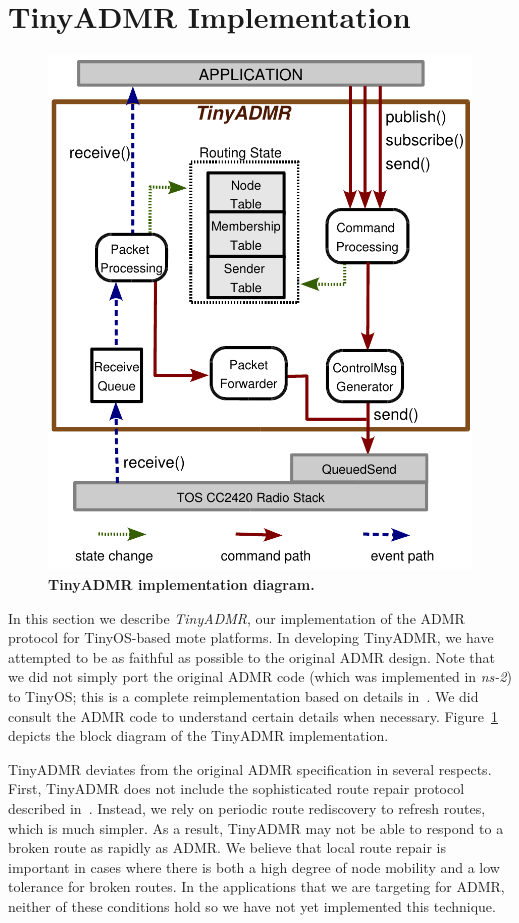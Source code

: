 \section{TinyADMR Implementation}
\label{sec-tinyadmr-impl}

\begin{figure}[t]
\begin{center}
\includegraphics[width=0.6\hsize]{resources/tinyadmr-techrept05/figures/impl/admr_impl_arch.pdf}
\end{center}
\caption{{\small {\bf TinyADMR implementation diagram.}
}}
\label{fig-admrm}
\end{figure}



In this section we describe {\em TinyADMR}, our implementation of 
the ADMR protocol for TinyOS-based mote platforms. In developing
TinyADMR, we have attempted to be as faithful as possible to the
original ADMR design. Note that we did not simply port the original 
ADMR code (which was implemented in {\em ns-2}) to TinyOS; this
is a complete reimplementation based on details in~\cite{admr}.
We did consult the ADMR code to understand certain details when 
necessary. Figure~\ref{fig-admrm} depicts the block diagram of 
the TinyADMR implementation. 

TinyADMR deviates from the original ADMR specification in several
respects. First, TinyADMR does not include the sophisticated
route repair protocol described in~\cite{admr}. Instead, we rely on
periodic route rediscovery to refresh routes, which is much simpler. 
As a result, TinyADMR may not be able to respond to a broken route
as rapidly as ADMR. We believe that local route repair is important
in cases where there is both a high degree of node mobility and
a low tolerance for broken routes. In the applications that we
are targeting for ADMR, neither of these conditions hold so we have
not yet implemented this technique.

